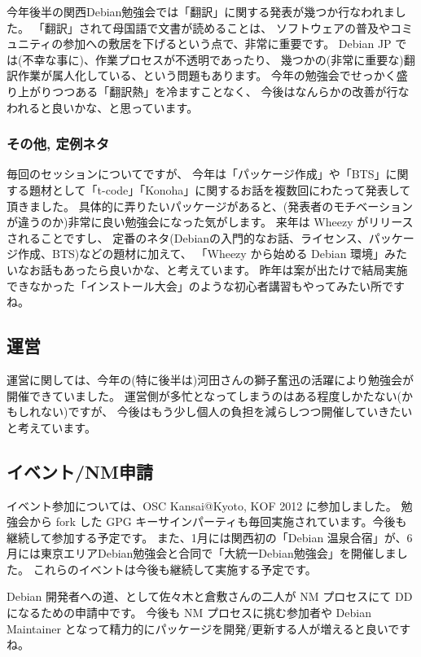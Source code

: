 \documentclass[mingoth,a4paper]{jsarticle}
\begin{document}
今年後半の関西Debian勉強会では「翻訳」に関する発表が幾つか行なわれました。
「翻訳」されて母国語で文書が読めることは、
ソフトウェアの普及やコミュニティの参加への敷居を下げるという点で、非常に重要です。
Debian JP では(不幸な事に)、作業プロセスが不透明であったり、
幾つかの(非常に重要な)翻訳作業が属人化している、という問題もあります。
今年の勉強会でせっかく盛り上がりつつある「翻訳熱」を冷ますことなく、
今後はなんらかの改善が行なわれると良いかな、と思っています。

\subsubsection{その他, 定例ネタ}

毎回のセッションについてですが、
今年は「パッケージ作成」や「BTS」に関する題材として「t-code」「Konoha」に関するお話を複数回にわたって発表して頂きました。
具体的に弄りたいパッケージがあると、(発表者のモチベーションが違うのか)非常に良い勉強会になった気がします。
来年は Wheezy がリリースされることですし、
定番のネタ(Debianの入門的なお話、ライセンス、パッケージ作成、BTS)などの題材に加えて、
「Wheezy から始める Debian 環境」みたいなお話もあったら良いかな、と考えています。
昨年は案が出たけで結局実施できなかった「インストール大会」のような初心者講習もやってみたい所ですね。

\subsection{運営}

運営に関しては、今年の(特に後半は)河田さんの獅子奮迅の活躍により勉強会が開催できていました。
運営側が多忙となってしまうのはある程度しかたない(かもしれない)ですが、
今後はもう少し個人の負担を減らしつつ開催していきたいと考えています。

\subsection{イベント/NM申請}

イベント参加については、OSC Kansai@Kyoto, KOF 2012 に参加しました。
勉強会から fork した GPG キーサインパーティも毎回実施されています。今後も継続して参加する予定です。
%
また、1月には関西初の「Debian 温泉合宿」が、6月には東京エリアDebian勉強会と合同で「大統一Debian勉強会」を開催しました。
これらのイベントは今後も継続して実施する予定です。

Debian 開発者への道、として佐々木と倉敷さんの二人が NM プロセスにて DD になるための申請中です。
今後も NM プロセスに挑む参加者や Debian Maintainer となって精力的にパッケージを開発/更新する人が増えると良いですね。
\end{document}
